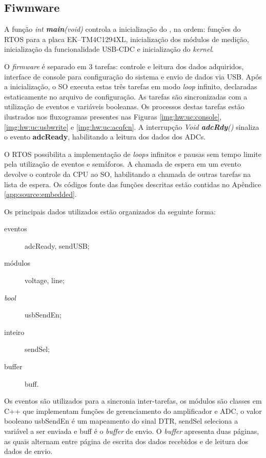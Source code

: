 		\subsection{Fiwmware}\label{sec:hw:firmware}

			A função \textit{int \textbf{main}(void)} controla a inicialização do , na ordem: funções do RTOS para a placa EK--TM4C1294XL, inicialização dos módulos de medição, inicialização da funcionalidade USB-CDC e inicialização do \textit{kernel}.

			O \textit{firmware} é separado em 3 tarefas: controle e leitura dos dados adquiridos, interface de console para configuração do sistema e envio de dados via USB. Após a inicialização, o SO executa estas três tarefas em modo \textit{loop} infinito, declaradas estaticamente no arquivo de configuração. As tarefas são sincronizadas com a utilização de eventos e variáveis booleanas. Os processos destas tarefas estão ilustrados nos fluxogramas presentes nas Figuras \ref{img:hw:uc:console}, \ref{img:hw:uc:usbwrite} e \ref{img:hw:uc:acqfcn}. A interrupção \textit{Void \textbf{adcRdy}()} sinaliza o evento \textbf{adcReady}, habilitando a leitura dos dados dos ADCs.

			O RTOS possibilita a implementação de \textit{loops} infinitos e pausas sem tempo limite pela utilização de eventos e semáforos. A chamada de espera em um evento devolve o controle da CPU ao SO, habilitando a chamada de outras tarefas na lista de espera. Os códigos fonte das funções descritas estão contidas no Apêndice \ref{app:source:embedded}.

			Os principais dados utilizados estão organizados da seguinte forma:

			\begin{description}
				\item[eventos] adcReady, sendUSB;
				\item[módulos] voltage, line;
				\item[\textit{bool}] usbSendEn;
				\item[inteiro] sendSel;
				\item[buffer] buff.
			\end{description}

			Os eventos são utilizados para a sincronia inter-tarefas, os módulos são classes em C++ que implementam funções de gerenciamento do amplificador e ADC, o valor booleano usbSendEn é um mapeamento do sinal DTR, sendSel seleciona a variável a ser enviada e buff é o \textit{buffer} de envio. O \textit{buffer} apresenta duas páginas, as quais alternam entre página de escrita dos dados recebidos e de leitura dos dados de envio.

